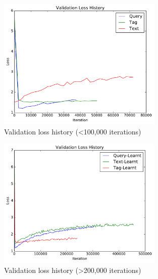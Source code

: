 \begin{figure}
    \centering
    \includegraphics[width=0.7\textwidth]{graphs/initial-validation-loss-history}
    \caption{Validation loss history (\textless 100,000 iterations)}
    \label{fig:val-loss-1}
\end{figure}

\begin{figure}
    \centering
    \includegraphics[width=0.7\textwidth]{graphs/validation-loss-history}
    \caption{Validation loss history (\textgreater 200,000 iterations)}
    \label{fig:val-loss-2}
\end{figure}